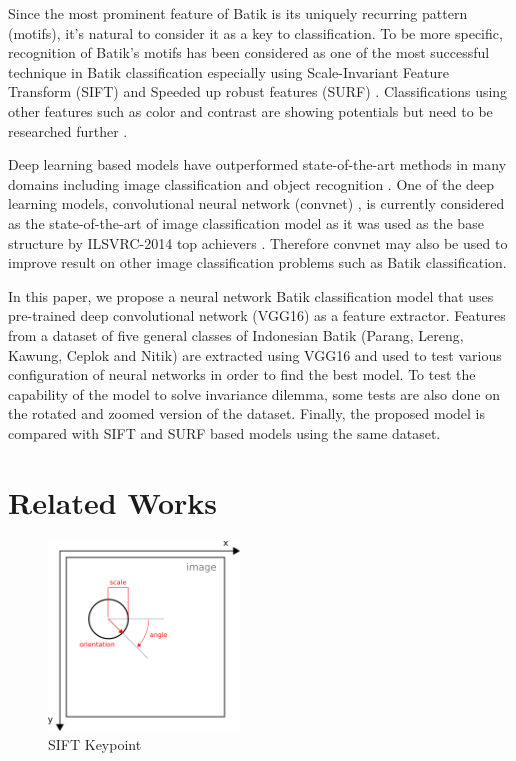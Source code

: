 \documentclass[conference, compsoc]{IEEEtran}
\begin{document}
Since the most prominent feature of Batik is its uniquely recurring pattern (motifs), it's natural to consider it as a key to classification. To be more specific, recognition of Batik's motifs has been considered as one of the most successful technique in Batik classification especially using Scale-Invariant Feature Transform (SIFT) \cite{azhar2015batik} \cite{nurhaida2015automatic} and Speeded up robust features (SURF) \cite{willy2013evaluation}. Classifications using other features such as color and contrast are showing potentials but need to be researched further \cite{moertini2005algorithms}.

Deep learning based models have outperformed state-of-the-art methods in many domains including image classification and object recognition \cite{lecun2015deep}. One of the deep learning models, convolutional neural network (convnet) \cite{lecun1998gradient}, is currently considered as the state-of-the-art of image classification model as it was used as the base structure by ILSVRC-2014 top achievers \cite{simonyan2014very}. Therefore convnet may also be used to improve result on other image classification problems such as Batik classification.

In this paper, we propose a neural network Batik classification model that uses pre-trained deep convolutional network (VGG16) \cite{simonyan2014very} as a feature extractor. Features from a dataset of five general classes of Indonesian Batik (Parang, Lereng, Kawung, Ceplok and Nitik) are extracted using VGG16 and used to test various configuration of neural networks in order to find the best model. To test the capability of the model to solve invariance dilemma, some tests are also done on the rotated and zoomed version of the dataset. Finally, the proposed model is compared with SIFT and SURF based models using the same dataset.

\section{Related Works}

\begin{figure}[h]
	\begin{center}
		\includegraphics[width=2.0in]{../sift-keypoint}
		\renewcommand{\figurename}{Fig.}		
		\caption{SIFT Keypoint}
		\label{fig_keypoint}
	\end{center}
\end{figure}
\end{document}

